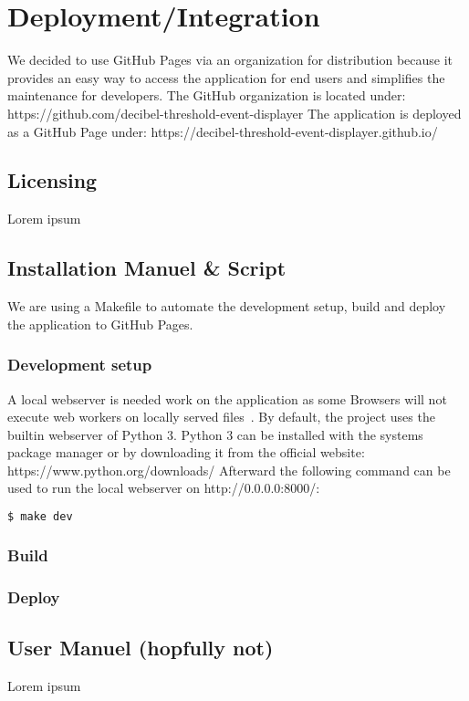\section{Deployment/Integration}
We decided to use GitHub Pages via an organization for distribution because it provides an easy way to access the
application for end users and simplifies the maintenance for developers.
The GitHub organization is located under: https://github.com/decibel-threshold-event-displayer
The application is deployed as a GitHub Page under: https://decibel-threshold-event-displayer.github.io/


\subsection{Licensing}
Lorem ipsum

\subsection{Installation Manuel \& Script}
We are using a Makefile to automate the development setup, build and deploy the application to GitHub Pages.

\subsubsection{Development setup}
A local webserver is needed work on the application as some Browsers will not execute web workers on locally served files~\cite{stackoverflow_chrome_cant_load_web_worker}.
By default, the project uses the builtin webserver of Python 3.
Python 3 can be installed with the systems package manager or by downloading it from the official website: https://www.python.org/downloads/
Afterward the following command can be used to run the local webserver on http://0.0.0.0:8000/:

\begin{lstlisting}[caption={Makefile: Start local webserver},label={lst:makefile_start_local_webserver},language=Bash]
$ make dev
\end{lstlisting}

\subsubsection{Build}

\subsubsection{Deploy}

\subsection{User Manuel (hopfully not)}
Lorem ipsum


